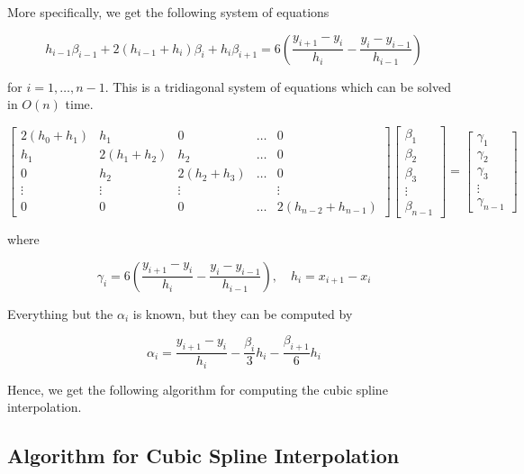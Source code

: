 More specifically, we get the following system of equations 

\[
    h_{i - 1}\beta_{i -1} + 2(h_{i - 1} + h_i)\beta_i + h_i \beta_{i + 1} = 6\left(\frac{y_{i + 1} - y_i}{h_i} - \frac{y_{i} - y_{i - 1}}{h_{i - 1}}\right)
\]

for \(i = 1, \dots, n - 1\). This is a tridiagonal system of equations which can be solved in \(O(n)\) time.

\[
    \begin{bmatrix}
        2(h_0 + h_1) & h_1 & 0 & \dots & 0 \\ 
        h_1 & 2(h_1 + h_2) & h_2 & \dots & 0 \\ 
        0 & h_2 & 2(h_2 + h_3) & \dots & 0 \\ 
        \vdots & \vdots & \vdots &  & \vdots \\ 
        0 & 0 & 0 & \dots & 2(h_{n - 2} + h_{n - 1})
    \end{bmatrix}
    \begin{bmatrix}
        \beta_1 \\ 
        \beta_2 \\ 
        \beta_3 \\ 
        \vdots \\ 
        \beta_{n - 1} 
    \end{bmatrix}
    = 
    \begin{bmatrix}
        \gamma_1 \\
        \gamma_2 \\
        \gamma_3 \\
        \vdots \\
        \gamma_{n - 1}
    \end{bmatrix}
\]

where

\[
    \gamma_i = 6\left(\frac{y_{i + 1} - y_i}{h_i} - \frac{y_{i} - y_{i - 1}}{h_{i - 1}}\right), \quad h_i = x_{i + 1} - x_i
\]

Everything but the \(\alpha_i\) is known, but they can be computed by

\[
    \alpha_i = \frac{y_{i + 1} - y_i}{h_i} - \frac{\beta_i}{3} h_i - \frac{\beta_{i + 1}}{6} h_i
\]

Hence, we get the following algorithm for computing the cubic spline interpolation. 

\subsection{Algorithm for Cubic Spline Interpolation}

